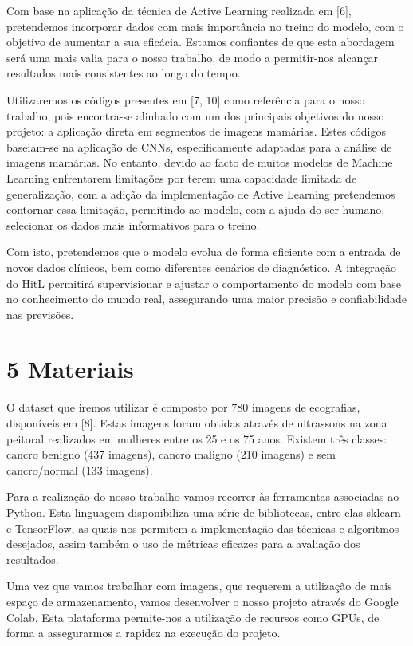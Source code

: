 \documentclass[10pt]{article}
\begin{document}
Com base na aplicação da técnica de Active Learning realizada em [6], pretendemos incorporar dados com mais importância no treino do modelo, com o objetivo de aumentar a sua eficácia. Estamos confiantes de que esta abordagem será uma mais valia para o nosso trabalho, de modo a permitir-nos alcançar resultados mais consistentes ao longo do tempo.

Utilizaremos os códigos presentes em [7, 10] como referência para o nosso trabalho, pois encontra-se alinhado com um dos principais objetivos do nosso projeto: a aplicação direta em segmentos de imagens mamárias. Estes códigos baseiam-se na aplicação de CNNs, especificamente adaptadas para a análise de imagens mamárias. No entanto, devido ao facto de muitos modelos de Machine Learning enfrentarem limitações por terem uma capacidade limitada de generalização, com a adição da implementação de Active Learning pretendemos contornar essa limitação, permitindo ao modelo, com a ajuda do ser humano, selecionar os dados mais informativos para o treino.

Com isto, pretendemos que o modelo evolua de forma eficiente com a entrada de novos dados clínicos, bem como diferentes cenários de diagnóstico. A integração do HitL permitirá supervisionar e ajustar o comportamento do modelo com base no conhecimento do mundo real, assegurando uma maior precisão e confiabilidade nas previsões.

\section*{5 Materiais}
O dataset que iremos utilizar é composto por 780 imagens de ecografias, disponíveis em [8]. Estas imagens foram obtidas através de ultrassons na zona peitoral realizados em mulheres entre os 25 e os 75 anos. Existem três classes: cancro benigno (437 imagens), cancro maligno (210 imagens) e sem cancro/normal (133 imagens).

Para a realização do nosso trabalho vamos recorrer às ferramentas associadas ao Python. Esta linguagem disponibiliza uma série de bibliotecas, entre elas sklearn e TensorFlow, as quais nos permitem a implementação das técnicas e algoritmos desejados, assim também o uso de métricas eficazes para a avaliação dos resultados.

Uma vez que vamos trabalhar com imagens, que requerem a utilização de mais espaço de armazenamento, vamos desenvolver o nosso projeto através do Google Colab. Esta plataforma permite-nos a utilização de recursos como GPUs, de forma a assegurarmos a rapidez na execução do projeto.
\end{document}
